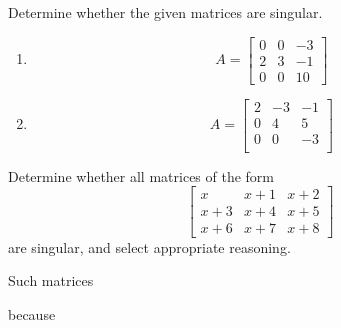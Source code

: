 \documentclass{ximera}
\author{Zack Reed}
\begin{document}
\begin{problem}
  Determine whether the given matrices are singular.
  \begin{enumerate}
    
    \item $$A=\begin{bmatrix}0&0&-3\\2&3&-1\\0&0&10\end{bmatrix}$$
      \begin{multipleChoice}
      \end{multipleChoice}

     
    \item $$A=\begin{bmatrix}2&-3&-1\\0&4&5\\0&0&-3\\\end{bmatrix}$$
      \begin{multipleChoice}
      \end{multipleChoice}
      \end{enumerate}

\end{problem}

\begin{problem}\label{prob:singmatrixdet2} Determine whether all matrices of the form
  $$\begin{bmatrix}x&x+1&x+2\\x+3&x+4&x+5\\x+6&x+7&x+8\end{bmatrix}$$
  are singular, and select appropriate reasoning.

  Such matrices \begin{multipleChoice}
     \end{multipleChoice}

     because \begin{selectAll}
     \end{selectAll}
  \end{problem}
\end{document}
